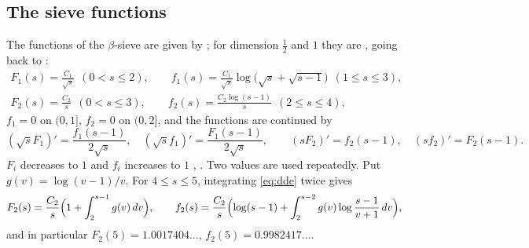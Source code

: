 \documentclass[11pt,a4paper]{amsart}
\theoremstyle{remark}
\numberwithin{equation}{section}
\begin{document}
\subsection{The sieve functions}\label{sec:functions}
The functions of the $\beta$-sieve are given by \cite[Theorem~11.12 and (11.55)--(11.63)]{FI}; for dimension
$\frac12$ and $1$ they are \cite[(14.2)--(14.3), (12.1)--(12.2)]{FI}, going back to \cite{Iw76,Iw80}:
\begin{gather*}
F_1(s)=\frac{C_1}{\sqrt s}\ \ (0<s\le2),\qquad f_1(s)=\frac{C_1}{\sqrt s}\log\bigl(\sqrt s+\sqrt{s-1}\bigr)\ \ (1\le s\le3),\\
F_2(s)=\frac{C_2}{s}\ \ (0<s\le3),\qquad f_2(s)=\frac{C_2\log(s-1)}{s}\ \ (2\le s\le4),
\end{gather*}
$f_1=0$ on $(0,1]$, $f_2=0$ on $(0,2]$, and the functions are continued by
\begin{equation}\label{eq:dde}
(\sqrt sF_1)'=\frac{f_1(s-1)}{2\sqrt s},\quad(\sqrt sf_1)'=\frac{F_1(s-1)}{2\sqrt s},\qquad
(sF_2)'=f_2(s-1),\quad(sf_2)'=F_2(s-1).
\end{equation}
$F_i$ decreases to $1$ and $f_i$ increases to $1$ \cite[Chapter~11]{FI}, \cite{Iw80}. Two values are used repeatedly. Put $g(v)=\log(v-1)/v$. For
$4\le s\le5$, integrating \eqref{eq:dde} twice gives
\begin{equation}\label{eq:F25}
F_2(s)=\frac{C_2}{s}\Bigl(1+\int_2^{s-1}g(v)\,dv\Bigr),\qquad
f_2(s)=\frac{C_2}{s}\Bigl(\log(s-1)+\int_2^{s-2}g(v)\log\frac{s-1}{v+1}\,dv\Bigr),
\end{equation}
and in particular $F_2(5)=1.0017404\ldots$, $f_2(5)=0.9982417\ldots$.
\end{document}

